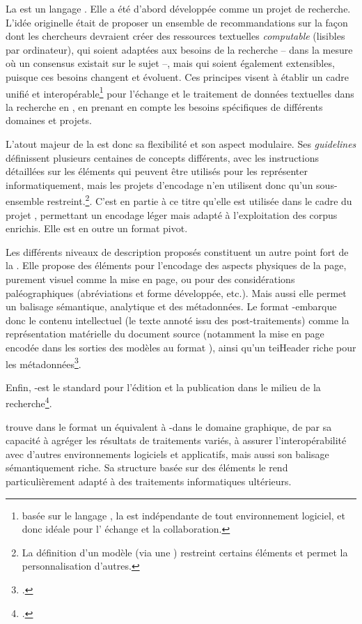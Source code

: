 La \tei est un langage \xml. Elle a été d’abord développée comme un projet de recherche. L’idée originelle était de proposer un ensemble de recommandations sur la façon dont les chercheurs devraient créer des ressources textuelles \textit{computable} (lisibles par ordinateur), qui soient adaptées aux besoins de la recherche – dans la mesure où un consensus existait sur le sujet –, mais qui soient également extensibles, puisque ces besoins changent et évoluent. Ces principes visent à établir un cadre unifié et interopérable\footnote{basée sur le langage \xml, la \tei est indépendante de tout environnement logiciel, et donc idéale pour l’ échange et la collaboration.} pour l'échange et le traitement de données textuelles dans la recherche en \shs, en prenant en compte les besoins spécifiques de différents domaines et projets.

L'atout majeur de la \tei est donc sa flexibilité et son aspect modulaire. Ses \textit{guidelines} définissent plusieurs centaines de concepts différents, avec les instructions détaillées sur les éléments qui peuvent être utilisés pour les représenter informatiquement, mais les projets d’encodage n'en utilisent donc qu'un sous-ensemble restreint.\footnote{La définition d'un
  modèle \tei (via une \odd) restreint certains éléments et permet la
  personnalisation d'autres.}. C'est en partie à ce titre qu'elle est utilisée dans le cadre du projet \gaga, permettant un encodage léger mais adapté à l'exploitation des corpus enrichis. Elle est en outre un format pivot. 

Les différents niveaux de description proposés constituent un autre point fort de la \tei. Elle propose des éléments pour l'encodage des aspects physiques de la page, purement visuel comme la mise en page, ou pour des considérations paléographiques (abréviations et forme développée, etc.). Mais aussi elle permet un balisage sémantique, analytique et des métadonnées. Le format \xml-\tei embarque donc le contenu intellectuel (le texte annoté issu des post-traitements) comme la représentation matérielle du document source (notamment la mise en page encodée dans les sorties des modèles \htr au format \alto), ainsi qu'un teiHeader riche pour les métadonnées\footcite{gabay_gallicorpor_2022}.

Enfin, \xml-\tei est le standard pour l'édition et la publication dans le milieu de la recherche\footcite{gabay_gallicorpor_2022}. 

\eida trouve dans le format \svg un équivalent à \xml-\tei dans le domaine graphique, de par sa capacité à agréger les résultats de traitements variés, à assurer l'interopérabilité avec d'autres environnements logiciels et applicatifs, mais aussi son balisage sémantiquement riche. Sa structure basée sur des éléments \xml le rend particulièrement adapté à des traitements informatiques ultérieurs. 

